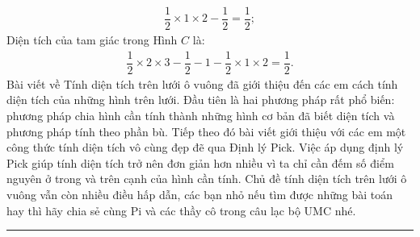 \begin{multicols}{2}
	\begin{align*}
		\dfrac{1}{2}\times 1\times 2 - \dfrac{1}{2} = \dfrac{1}{2};
	\end{align*}
	Diện tích của tam giác trong Hình $C$ là: 
	\begin{align*}
		\dfrac{1}{2}\times2\times3 - \dfrac{1}{2} - 1 - \dfrac{1}{2}\times1\times2 = \dfrac{1}{2}.
	\end{align*}
	Bài viết về Tính diện tích trên lưới ô vuông đã giới thiệu đến các em cách tính diện tích của những hình trên lưới. Đầu tiên là hai phương pháp rất phổ biến: phương pháp chia hình cần tính thành những hình cơ bản đã biết diện tích và phương pháp tính theo phần bù. Tiếp theo đó bài viết giới thiệu với các em một công thức tính diện tích vô cùng đẹp đẽ qua Định lý Pick. Việc áp dụng định lý Pick giúp tính diện tích trở nên đơn giản hơn nhiều vì ta chỉ cần đếm số điểm nguyên ở trong và trên cạnh của hình cần tính. Chủ đề tính diện tích trên lưới ô vuông vẫn còn nhiều điều hấp dẫn, các bạn nhỏ nếu tìm được những bài toán hay thì hãy chia sẻ cùng Pi và các thầy cô trong câu lạc bộ UMC nhé.
\end{multicols}
\vspace*{-10pt}
{\color{toancuabi}\rule{1\linewidth}{0.1pt}}
\begingroup
{} 
